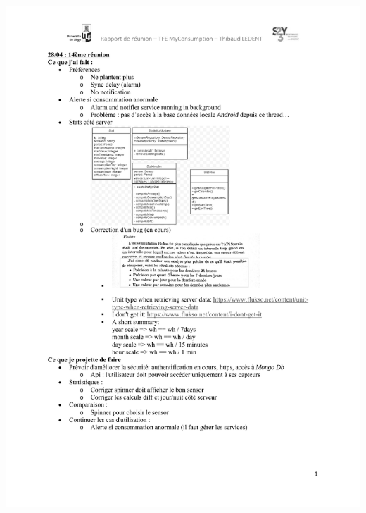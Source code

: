 \documentclass[a4paper, oneside, 11pt]{book}
\begin{document}
\includegraphics[width=1\textwidth]{reports_NB_Part15.pdf}
\newpage
\end{document}
